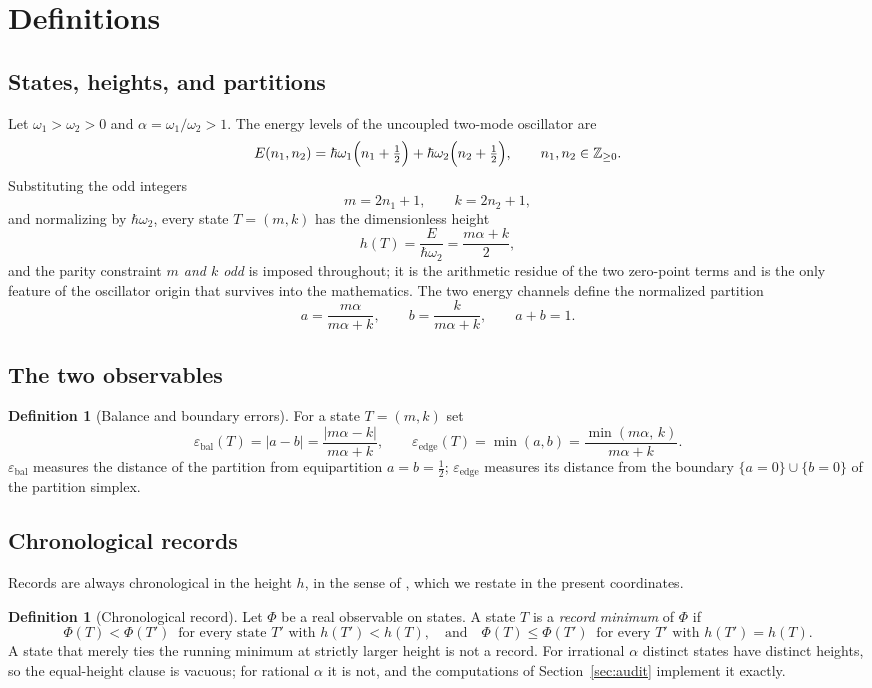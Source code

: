 \documentclass[11pt]{article}
\theoremstyle{definition}
\newtheorem{definition}[theorem]{Definition}
\theoremstyle{remark}
\newcommand{\eb}{\varepsilon_{\mathrm{bal}}}
\newcommand{\ee}{\varepsilon_{\mathrm{edge}}}
\newcommand{\ZZ}{\mathbb{Z}}
\begin{document}
\section{Definitions}

\subsection{States, heights, and partitions}

Let $\omega_1>\omega_2>0$ and $\alpha=\omega_1/\omega_2>1$. The energy levels of the uncoupled two-mode oscillator are
\[
E(n_1,n_2)=\hbar\omega_1\Bigl(n_1+\tfrac12\Bigr)+\hbar\omega_2\Bigl(n_2+\tfrac12\Bigr),
\qquad n_1,n_2\in\ZZ_{\ge0}.
\]
Substituting the odd integers
\[
m=2n_1+1,\qquad k=2n_2+1,
\]
and normalizing by $\hbar\omega_2$, every state $T=(m,k)$ has the dimensionless height
\[
h(T)=\frac{E}{\hbar\omega_2}=\frac{m\alpha+k}{2},
\]
and the parity constraint \emph{$m$ and $k$ odd} is imposed throughout; it is the arithmetic residue of the two zero-point terms and is the only feature of the oscillator origin that survives into the mathematics. The two energy channels define the normalized partition
\[
a=\frac{m\alpha}{m\alpha+k},\qquad b=\frac{k}{m\alpha+k},\qquad a+b=1 .
\]

\subsection{The two observables}

\begin{definition}[Balance and boundary errors]\label{def:obs}
For a state $T=(m,k)$ set
\[
\eb(T)=|a-b|=\frac{|m\alpha-k|}{m\alpha+k},
\qquad
\ee(T)=\min(a,b)=\frac{\min(m\alpha,\,k)}{m\alpha+k}.
\]
$\eb$ measures the distance of the partition from equipartition $a=b=\tfrac12$; $\ee$ measures its distance from the boundary $\{a=0\}\cup\{b=0\}$ of the partition simplex.
\end{definition}

\subsection{Chronological records}

Records are always chronological in the height $h$, in the sense of \cite[Def.~1.1]{quartercircle}, which we restate in the present coordinates.

\begin{definition}[Chronological record]\label{def:record}
Let $\Phi$ be a real observable on states. A state $T$ is a \emph{record minimum} of $\Phi$ if
\[
\Phi(T)<\Phi(T')\ \text{ for every state } T' \text{ with } h(T')<h(T),
\quad\text{and}\quad
\Phi(T)\le\Phi(T')\ \text{ for every } T' \text{ with } h(T')=h(T).
\]
A state that merely ties the running minimum at strictly larger height is not a record. For irrational $\alpha$ distinct states have distinct heights, so the equal-height clause is vacuous; for rational $\alpha$ it is not, and the computations of Section~\ref{sec:audit} implement it exactly.
\end{definition}
\end{document}
